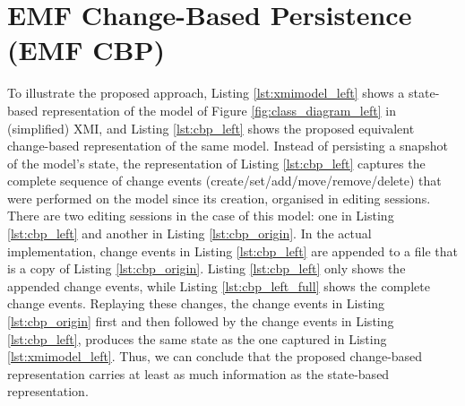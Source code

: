 \section{EMF Change-Based Persistence (EMF CBP)}
\label{sec:emf_change_based_persistence}
To illustrate the proposed approach, Listing \ref{lst:xmimodel_left} shows a state-based representation of the model of Figure \ref{fig:class_diagram_left} in (simplified) XMI, and Listing \ref{lst:cbp_left} shows the proposed equivalent change-based representation of the same model. Instead of persisting a snapshot of the model's state, the representation of Listing \ref{lst:cbp_left} captures the complete sequence of change events (create/set/add/move/remove/delete) that were performed on the model since its creation, organised in editing sessions. There are two editing sessions in the case of this model: one in Listing \ref{lst:cbp_left} and another in Listing \ref{lst:cbp_origin}. In the actual implementation, change events in Listing \ref{lst:cbp_left} are appended to a file that is a copy of Listing \ref{lst:cbp_origin}. Listing \ref{lst:cbp_left} only shows the appended change events, while Listing \ref{lst:cbp_left_full} shows the complete change events. Replaying these changes, the change events in Listing \ref{lst:cbp_origin} first and then followed by the change events in Listing \ref{lst:cbp_left}, produces the same state as the one captured in Listing \ref{lst:xmimodel_left}. Thus, we can conclude that the proposed change-based representation carries at least as much information as the state-based representation. 

